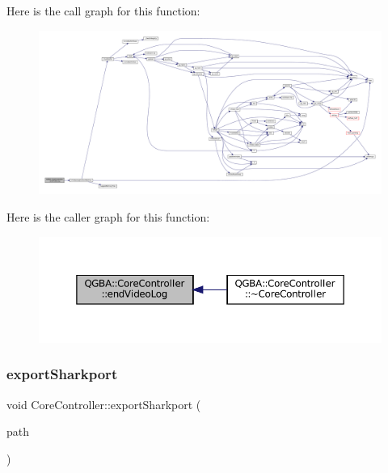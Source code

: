 Here is the call graph for this function\+:
\nopagebreak
\begin{figure}[H]
\begin{center}
\leavevmode
\includegraphics[width=350pt]{class_q_g_b_a_1_1_core_controller_a71a8499d2b02fc6b86b13cd82080799f_cgraph}
\end{center}
\end{figure}
Here is the caller graph for this function\+:
\nopagebreak
\begin{figure}[H]
\begin{center}
\leavevmode
\includegraphics[width=350pt]{class_q_g_b_a_1_1_core_controller_a71a8499d2b02fc6b86b13cd82080799f_icgraph}
\end{center}
\end{figure}
\mbox{\label{class_q_g_b_a_1_1_core_controller_a02397060e26021b7e8bffe715f95accb}} 
\subsubsection{\texorpdfstring{export\+Sharkport}{exportSharkport}}
{\footnotesize\ttfamily void Core\+Controller\+::export\+Sharkport (\begin{DoxyParamCaption}\item[{const Q\+String \&}]{path }\end{DoxyParamCaption})\hspace{0.3cm}{\ttfamily [slot]}}

